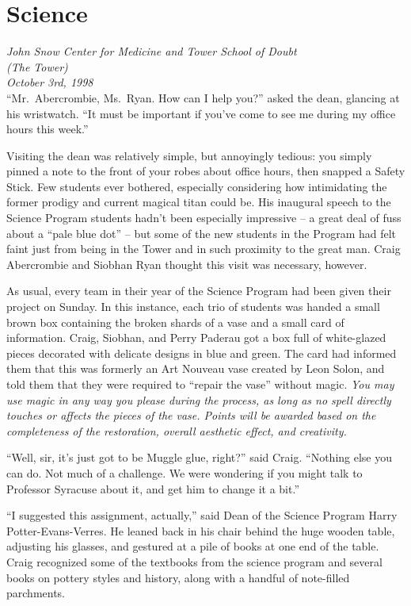 \Startbonus

\hypertarget{science}{%
\chapter{Science}\label{science}}

\emph{John Snow Center for Medicine and Tower School of Doubt\\
(The Tower)}\\
\emph{October 3rd, 1998}\\

``Mr.~Abercrombie, Ms.~Ryan. How can I help you?'' asked the dean,
glancing at his wristwatch. ``It must be important if you've come to see
me during my office hours this week.''

Visiting the dean was relatively simple, but annoyingly tedious: you
simply pinned a note to the front of your robes about office hours, then
snapped a Safety Stick. Few students ever bothered, especially
considering how intimidating the former prodigy and current magical
titan could be. His inaugural speech to the Science Program students
hadn't been especially impressive -- a great deal of fuss about a ``pale
blue dot'' -- but some of the new students in the Program had felt faint
just from being in the Tower and in such proximity to the great man.
Craig Abercrombie and Siobhan Ryan thought this visit was necessary,
however.

As usual, every team in their year of the Science Program had been given
their project on Sunday. In this instance, each trio of students was
handed a small brown box containing the broken shards of a vase and a
small card of information. Craig, Siobhan, and Perry Paderau got a box
full of white-glazed pieces decorated with delicate designs in blue and
green. The card had informed them that this was formerly an Art Nouveau
vase created by Leon Solon, and told them that they were required to
``repair the vase'' without magic. \emph{You may use magic in any way
you please during the process, as long as no spell directly touches or
affects the pieces of the vase. Points will be awarded based on the
completeness of the restoration, overall aesthetic effect, and
creativity.}

``Well, sir, it's just got to be Muggle glue, right?'' said Craig.
``Nothing else you can do. Not much of a challenge. We were wondering if
you might talk to Professor Syracuse about it, and get him to change it
a bit.''

``I suggested this assignment, actually,'' said Dean of the Science
Program Harry Potter-Evans-Verres. He leaned back in his chair behind
the huge wooden table, adjusting his glasses, and gestured at a pile of
books at one end of the table. Craig recognized some of the textbooks
from the science program and several books on pottery styles and
history, along with a handful of note-filled parchments.

